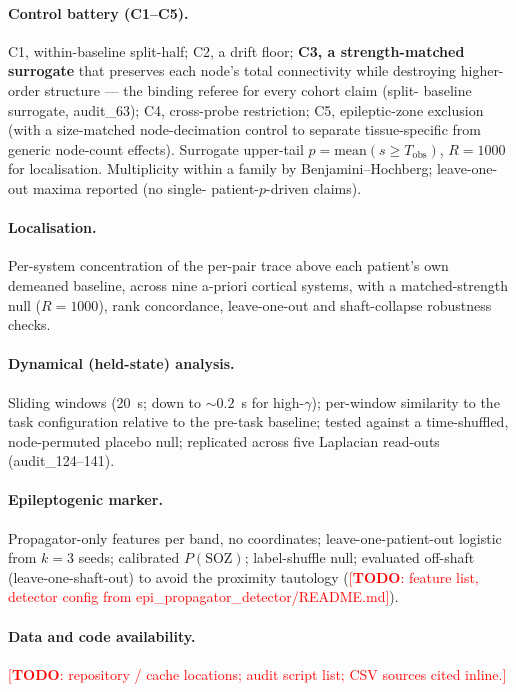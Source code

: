 \documentclass[11pt]{article}
\newcommand{\TODO}[1]{\textcolor{red}{[\textbf{TODO}: #1]}}
\begin{document}
\paragraph{Control battery (C1--C5).}
C1, within-baseline split-half; C2, a drift floor; \textbf{C3, a strength-matched
surrogate} that preserves each node's total connectivity while destroying
higher-order structure --- the binding referee for every cohort claim (split-
baseline surrogate, audit\_63); C4, cross-probe restriction; C5,
epileptic-zone exclusion (with a size-matched node-decimation control to separate
tissue-specific from generic node-count effects). Surrogate upper-tail
$p=\mathrm{mean}(s\ge T_{\text{obs}})$, $R=1000$ for localisation. Multiplicity
within a family by Benjamini--Hochberg; leave-one-out maxima reported (no single-
patient-$p$-driven claims).

\paragraph{Localisation.}
Per-system concentration of the per-pair trace above each patient's own demeaned
baseline, across nine a-priori cortical systems, with a matched-strength null
($R=1000$), rank concordance, leave-one-out and shaft-collapse robustness checks.

\paragraph{Dynamical (held-state) analysis.}
Sliding windows (20~s; down to $\sim0.2$~s for high-$\gamma$); per-window
similarity to the task configuration relative to the pre-task baseline; tested
against a time-shuffled, node-permuted placebo null; replicated across five
Laplacian read-outs (audit\_124--141).

\paragraph{Epileptogenic marker.}
Propagator-only features per band, no coordinates; leave-one-patient-out logistic
from $k=3$ seeds; calibrated $P(\mathrm{SOZ})$; label-shuffle null; evaluated
off-shaft (leave-one-shaft-out) to avoid the proximity tautology
(\TODO{feature list, detector config from epi\_propagator\_detector/README.md}).

\paragraph{Data and code availability.}
\TODO{repository / cache locations; audit script list; CSV sources cited inline.}
\end{document}
